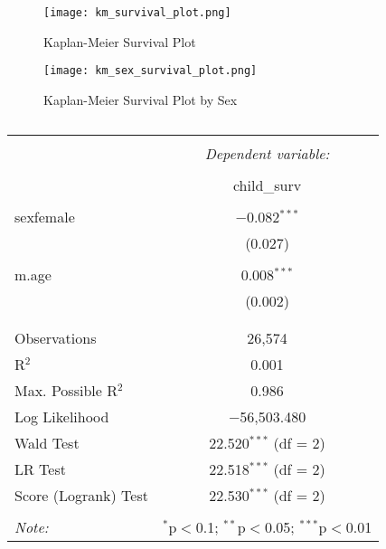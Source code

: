 \documentclass[12pt,letterpaper]{article}
\begin{document}
\begin{figure}[htbp]
	\centering
	\texttt{[image: km\_survival\_plot.png]} %
	\caption{Kaplan-Meier Survival Plot}
	\label{fig:km_survival_plot}
\end{figure}
\vspace{-1cm}
\begin{figure}[htbp]
	\centering
	\texttt{[image: km\_sex\_survival\_plot.png]} %
	\caption{Kaplan-Meier Survival Plot by Sex}
	\label{fig:km_sex_survival_plot}
\end{figure}

\newpage
\begin{table}[!htbp] \centering 
	\caption{} 
	\label{} 
	\begin{tabular}{@{\extracolsep{5pt}}lc} 
		\\[-1.8ex]\hline 
		\hline \\[-1.8ex] 
		& \multicolumn{1}{c}{\textit{Dependent variable:}} \\ 
		\cline{2-2} 
		\\[-1.8ex] & child\_surv \\ 
		\hline \\[-1.8ex] 
		sexfemale & $-$0.082$^{***}$ \\ 
		& (0.027) \\ 
		& \\ 
		m.age & 0.008$^{***}$ \\ 
		& (0.002) \\ 
		& \\ 
		\hline \\[-1.8ex] 
		Observations & 26,574 \\ 
		R$^{2}$ & 0.001 \\ 
		Max. Possible R$^{2}$ & 0.986 \\ 
		Log Likelihood & $-$56,503.480 \\ 
		Wald Test & 22.520$^{***}$ (df = 2) \\ 
		LR Test & 22.518$^{***}$ (df = 2) \\ 
		Score (Logrank) Test & 22.530$^{***}$ (df = 2) \\ 
		\hline 
		\hline \\[-1.8ex] 
		\textit{Note:}  & \multicolumn{1}{r}{$^{*}$p$<$0.1; $^{**}$p$<$0.05; $^{***}$p$<$0.01} \\ 
	\end{tabular} 
\end{table} 
\end{document}
